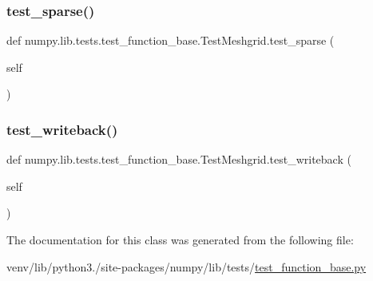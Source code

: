 \subsubsection{\texorpdfstring{test\+\_\+sparse()}{test\_sparse()}}
{\footnotesize\ttfamily def numpy.\+lib.\+tests.\+test\+\_\+function\+\_\+base.\+Test\+Meshgrid.\+test\+\_\+sparse (\begin{DoxyParamCaption}\item[{}]{self }\end{DoxyParamCaption})}

\mbox{\label{classnumpy_1_1lib_1_1tests_1_1test__function__base_1_1TestMeshgrid_ac70e92739e1f7536c01e18c79499b02e}} 
\subsubsection{\texorpdfstring{test\+\_\+writeback()}{test\_writeback()}}
{\footnotesize\ttfamily def numpy.\+lib.\+tests.\+test\+\_\+function\+\_\+base.\+Test\+Meshgrid.\+test\+\_\+writeback (\begin{DoxyParamCaption}\item[{}]{self }\end{DoxyParamCaption})}



The documentation for this class was generated from the following file\+:\begin{DoxyCompactItemize}
\item 
venv/lib/python3./site-\/packages/numpy/lib/tests/\hyperlink{lib_2tests_2test__function__base_8py}{test\+\_\+function\+\_\+base.\+py}\end{DoxyCompactItemize}
